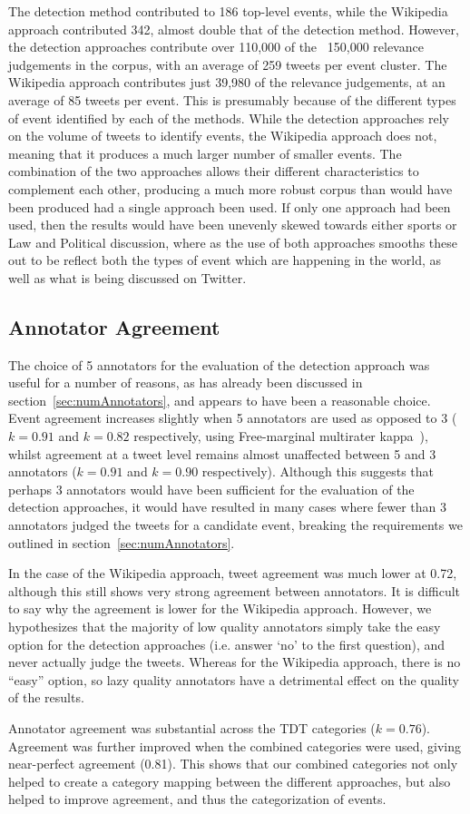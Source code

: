 The detection method contributed to 186 top-level events, while the Wikipedia approach contributed 342, almost double that of the detection method.
However, the detection approaches contribute over 110,000 of the ~150,000 relevance judgements in the corpus, with an average of 259 tweets per event cluster.
The Wikipedia approach contributes just 39,980 of the relevance judgements, at an average of 85 tweets per event.
This is presumably because of the different types of event identified by each of the methods.
While the detection approaches rely on the volume of tweets to identify events, the Wikipedia approach does not, meaning that it produces a much larger number of smaller events.
The combination of the two approaches allows their different characteristics to complement each other, producing a much more robust corpus than would have been produced had a single approach been used.
If only one approach had been used, then the results would have been unevenly skewed towards either sports or Law and Political discussion, where as the use of both approaches smooths these out to be reflect both the types of event which are happening in the world, as well as what is being discussed on Twitter.

\subsection{Annotator Agreement}
\label{sec:agreement}
The choice of 5 annotators for the evaluation of the detection approach was useful for a number of reasons, as has already been discussed in section~\ref{sec:numAnnotators}, and appears to have been a reasonable choice.
Event agreement increases slightly when 5 annotators are used as opposed to 3 (\(k = 0.91\) and \(k = 0.82\) respectively, using Free-marginal multirater kappa~\citep{Randolph}), whilst agreement at a tweet level remains almost unaffected between 5 and 3 annotators (\(k = 0.91\) and \(k = 0.90\) respectively).
Although this suggests that perhaps 3 annotators would have been sufficient for the evaluation of the detection approaches, it would have resulted in many cases where fewer than 3 annotators judged the tweets for a candidate event, breaking the requirements we outlined in section~\ref{sec:numAnnotators}.

In the case of the Wikipedia approach, tweet agreement was much lower at 0.72, although this still shows very strong agreement between annotators.
It is difficult to say why the agreement is lower for the Wikipedia approach.
However, we hypothesizes that the majority of low quality annotators simply take the easy option for the detection approaches (i.e. answer `no' to the first question), and never actually judge the tweets.
Whereas for the Wikipedia approach, there is no ``easy'' option, so lazy quality annotators have a detrimental effect on the quality of the results.

Annotator agreement was substantial across the TDT categories (\(k = 0.76\)). Agreement was further improved when the combined categories were used, giving near-perfect agreement (0.81).
This shows that our combined categories not only helped to create a category mapping between the different approaches, but also helped to improve agreement, and thus the categorization of events.